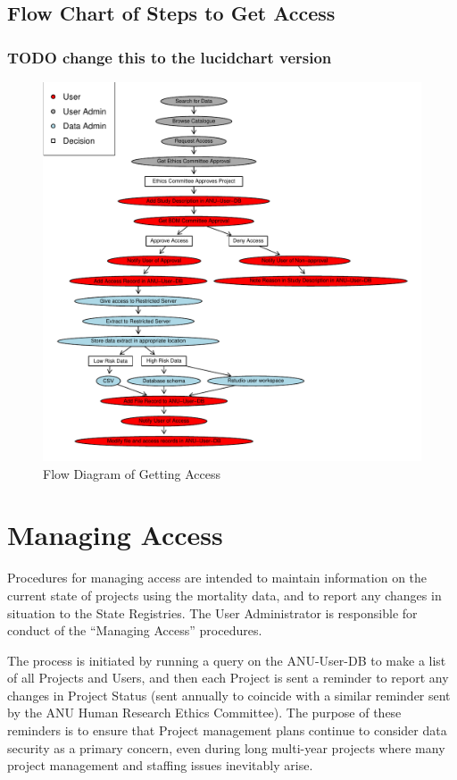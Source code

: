 \documentclass[a4paper]{article}
\begin{document}
\subsection{Flow Chart of Steps to Get Access}
\label{sec-2-1}
\subsubsection{\textbf{TODO} change this to the lucidchart version}
\label{sec-2-1-1}

\begin{figure}[!h]
\centering
\includegraphics[width=1.5\textwidth]{DataAccessFlowDiagram-GettingAccess.pdf}
\caption{Flow Diagram of Getting Access}
\label{fig:DataAccessFlowDiagram-GettingAccess}
\end{figure}
\clearpage
\section{Managing Access}
\label{sec-3}

Procedures for managing access are intended to maintain information on the current state of projects using the mortality data, and to report any changes in situation to the State Registries. The User Administrator is responsible for conduct of the ``Managing Access'' procedures.

The process is initiated by running a query on the ANU-User-DB to make a list of all Projects and Users, and then each Project is sent a reminder to report any changes in Project Status (sent annually to coincide with a similar reminder sent by the ANU Human Research Ethics Committee). The purpose of these reminders is to ensure that Project management plans continue to consider data security as a primary concern, even during long multi-year projects where many project management and staffing issues inevitably arise.
\end{document}
